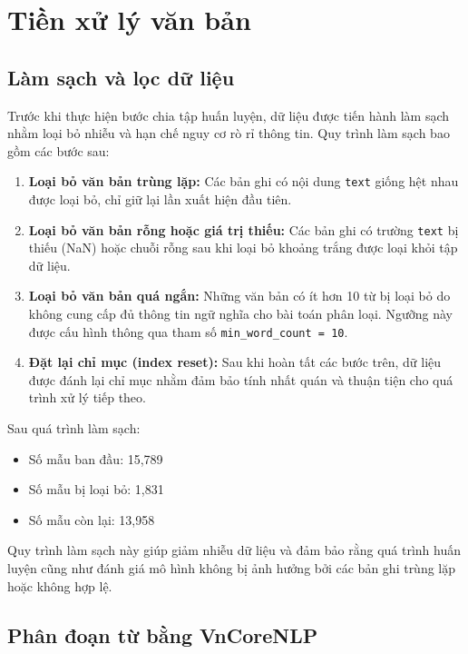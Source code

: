 \documentclass[12pt, a4paper]{report}
\newcommand{\nRaw}{15,789}              %
\newcommand{\nRemoved}{1,831}            %
\newcommand{\nClean}{13,958}             %
\begin{document}
\section{Tiền xử lý văn bản}

\subsection{Làm sạch và lọc dữ liệu}

Trước khi thực hiện bước chia tập huấn luyện, dữ liệu được tiến hành làm sạch 
nhằm loại bỏ nhiễu và hạn chế nguy cơ rò rỉ thông tin. Quy trình làm sạch bao gồm các bước sau:

\begin{enumerate}[leftmargin=2.5em]
  \item \textbf{Loại bỏ văn bản trùng lặp:} 
  Các bản ghi có nội dung \texttt{text} giống hệt nhau được loại bỏ, 
  chỉ giữ lại lần xuất hiện đầu tiên.

  \item \textbf{Loại bỏ văn bản rỗng hoặc giá trị thiếu:} 
  Các bản ghi có trường \texttt{text} bị thiếu (NaN) hoặc chuỗi rỗng 
  sau khi loại bỏ khoảng trắng được loại khỏi tập dữ liệu.

  \item \textbf{Loại bỏ văn bản quá ngắn:} 
  Những văn bản có ít hơn 10 từ bị loại bỏ do không cung cấp đủ 
  thông tin ngữ nghĩa cho bài toán phân loại. 
  Ngưỡng này được cấu hình thông qua tham số \texttt{min\_word\_count = 10}.

  \item \textbf{Đặt lại chỉ mục (index reset):} 
  Sau khi hoàn tất các bước trên, dữ liệu được đánh lại chỉ mục 
  nhằm đảm bảo tính nhất quán và thuận tiện cho quá trình xử lý tiếp theo.
\end{enumerate}

Sau quá trình làm sạch:

\begin{itemize}[leftmargin=2em]
  \item Số mẫu ban đầu: \nRaw
  \item Số mẫu bị loại bỏ: \nRemoved
  \item Số mẫu còn lại: \nClean
\end{itemize}

Quy trình làm sạch này giúp giảm nhiễu dữ liệu và đảm bảo rằng 
quá trình huấn luyện cũng như đánh giá mô hình không bị ảnh hưởng 
bởi các bản ghi trùng lặp hoặc không hợp lệ.

\subsection{Phân đoạn từ bằng VnCoreNLP}
\end{document}
